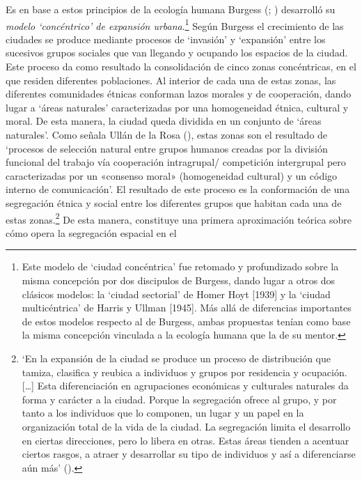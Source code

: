 \documentclass[
  spanish,
  a4paper,%
  chapterprefix=true,%
  DIV=calc,%
  twoside]{scrbook}%
\begin{document}
Es en base a estos principios de la ecología humana Burgess
(; ) desarrolló su \emph{modelo `concéntrico' de
expansión urbana}.\footnote{Este modelo de `ciudad concéntrica' fue retomado y
  profundizado sobre la misma concepción por dos discipulos de
  Burgess, dando lugar a otros dos clásicos modelos: la `ciudad
  sectorial' de Homer Hoyt {[}1939{]} y la `ciudad multicéntrica' de
  Harris y Ullman {[}1945{]}. Más allá de diferencias importantes de estos
  modelos respecto al de Burgess, ambas propuestas tenían como base la
  misma concepción vinculada a la ecología humana que la de su mentor.} Según Burgess el crecimiento de
las ciudades se produce mediante procesos de `invasión' y `expansión'
entre los sucesivos grupos sociales que van llegando y ocupando los
espacios de la ciudad. Este proceso da como resultado la consolidación
de cinco zonas concéntricas, en el que residen diferentes poblaciones.
Al interior de cada una de estas zonas, las diferentes comunidades
étnicas conforman lazos morales y de cooperación, dando lugar a `áreas
naturales' caracterizadas por una homogeneidad étnica, cultural y moral.
De esta manera, la ciudad queda dividida en un conjunto de `áreas
naturales'. Como señala Ullán de la Rosa (), estas zonas son el
resultado de `procesos de selección natural entre grupos humanos creadas
por la división funcional del trabajo vía cooperación intragrupal/
competición intergrupal pero caracterizadas por un «consenso moral»
(homogeneidad cultural) y un código interno de comunicación'. El
resultado de este proceso es la conformación de una segregación étnica y
social entre los diferentes grupos que habitan cada una de estas
zonas.\footnote{`En la expansión de la ciudad se produce un proceso
  de distribución que tamiza, clasifica y reubica a individuos y
  grupos por residencia y ocupación. {[}\ldots{]} Esta diferenciación en
  agrupaciones económicas y culturales naturales da forma y carácter a
  la ciudad. Porque la segregación ofrece al grupo, y por tanto a los
  individuos que lo componen, un lugar y un papel en la organización
  total de la vida de la ciudad. La segregación limita el desarrollo
  en ciertas direcciones, pero lo libera en otras. Estas áreas tienden
  a acentuar ciertos rasgos, a atraer y desarrollar su tipo de
  individuos y así a diferenciarse aún más' ().} De esta manera, constituye una primera
aproximación teórica sobre cómo opera la segregación espacial en el
\end{document}
